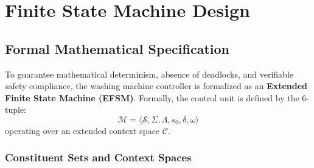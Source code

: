 \section{Finite State Machine Design}
\label{sec:fsm}

\subsection{Formal Mathematical Specification}

To guarantee mathematical determinism, absence of deadlocks, and verifiable safety compliance, the
washing machine controller is formalized as an \textbf{Extended Finite State Machine (EFSM)}.
Formally, the control unit is defined by the 6-tuple:
\begin{equation}
  \mathcal{M} = \big\langle \mathcal{S}, \Sigma, \Lambda, s_0, \delta, \omega \big\rangle
  \label{eq:fsm-tuple}
\end{equation}
operating over an extended context space $\mathcal{C}$.

\subsubsection{Constituent Sets and Context Spaces}

